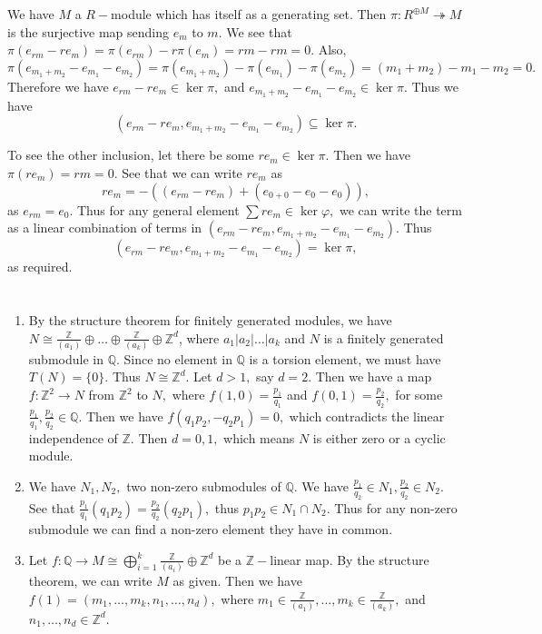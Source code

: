 \documentclass{article}
\begin{document}
\section{} %

\section{} %
We have $M$ a $R-$module which has itself as a generating set. Then $\pi: R^{\oplus M}\twoheadrightarrow M$ is the surjective map sending $e_m$ to $m.$ We 
see that $\pi(e_{rm}-re_m)=\pi(e_{rm})-r\pi(e_m)=rm-rm=0.$ Also, $\pi(e_{m_1+m_2}-e_{m_1}-e_{m_2})=\pi(e_{m_1+m_2})-\pi(e_{m_1})-\pi(e_{m_2})= 
(m_1+m_2)-m_1-m_2=0.$ Therefore we have $ e_{rm}-re_m \in \ker \pi, $ and $e_{m_1+m_2}-e_{m_1}-e_{m_2} \in \ker \pi.$ Thus we have 
$$(e_{rm}-re_m,e_{m_1+m_2}-e_{m_1}-e_{m_2}) \subseteq \ker \pi.$$ 

To see the other inclusion, let there be some $re_m \in \ker \pi.$ Then we have $\pi(re_m)=rm=0.$ See that we can write $re_m$ as $$re_m=-( 
(e_{rm}-re_m)+(e_{0+0}-e_0-e_0) ),$$ as $e_{rm}=e_0.$ Thus for any general element $\sum re_m \in \ker \varphi ,$ we can write the term as a linear 
combination 
of terms in $\left(e_{rm}-re_m, e_{m_1+m_2}-e_{m_1}-e_{m_2}\right).$ Thus $$(e_{rm}-re_m,e_{m_1+m_2}-e_{m_1}-e_{m_2})= \ker \pi, $$ as required. 
\section{} %
\begin{enumerate}
	\item By the structure theorem for finitely generated modules, we have $N \cong \frac{\mathbb{Z}}{(a_1)}\oplus \dots \oplus 
	\frac{\mathbb{Z}}{(a_k)}\oplus \mathbb{Z}^d$, where $a_1|a_2|\dots|a_k$ and $N$ is a finitely generated submodule in $\mathbb{Q}.$ Since no element in 
	$\mathbb{Q}$ is a torsion element, we must have $T(N)=\{0\}.$ Thus $N \cong \mathbb{Z}^d.$ Let $d >1,$ say $d=2.$ Then we have a map $f: \mathbb{Z}^2 
	\rightarrow N$ from $\mathbb{Z}^2$ to $N,$ where $f(1,0)=\frac{p_1}{q_1}$ and $f(0,1)=\frac{p_2}{q_2},$ for some $\frac{p_1}{q_1},\frac{p_2}{q_2} \in 
	\mathbb{Q}.$ Then we have $ f(q_1p_2,-q_2p_1)=0, $ which contradicts the linear independence of $\mathbb{Z}.$ Then $d=0,1,$ which means $N$ is either 
	zero or a cyclic module.
	
	\item We have $N_1,N_2,$ two non-zero submodules of $\mathbb{Q}.$ We have $\frac{p_1}{q_2} \in N_1, \frac{p_2}{q_2} \in N_2.$ See that $ 
	\frac{p_1}{q_1}(q_1p_2)=\frac{p_2}{q_2}(q_2p_1),$ thus $p_1p_2 \in N_1 \cap N_2.$ Thus for any non-zero submodule we can find a non-zero element they 
	have in common. 
	
	\item Let $f: \mathbb{Q} \rightarrow M \cong \bigoplus_{i=1}^k \frac{\mathbb{Z}}{(a_i)} \oplus \mathbb{Z}^d$ be a $\mathbb{Z}-$linear map. By the 
	structure theorem, we can write $M$ as given. Then we have $f(1)=(m_1,\dots,m_k,n_1,\dots,n_d),$ where $m_1 \in \frac{\mathbb{Z}}{(a_1)}, \dots, m_k \in 
	\frac{\mathbb{Z}}{(a_k)},$ and $n_1,\dots,n_d \in \mathbb{Z}^d.$ 
	
\end{enumerate}
\end{document}

